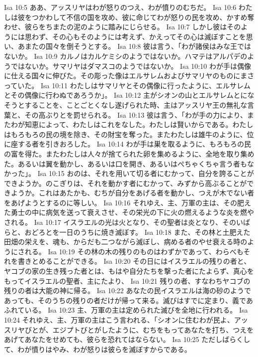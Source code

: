 Isa 10:5  ああ、アッスリヤはわが怒りのつえ、わが憤りのむちだ。
Isa 10:6  わたしは彼をつかわして不信の国を攻め、彼に命じてわが怒りの民を攻め、かすめ奪わせ、彼らをちまたの泥のように踏みにじらせる。
Isa 10:7  しかし彼はそのようには思わず、その心もそのようには考えず、かえってその心は滅ぼすことを思い、あまたの国々を倒そうとする。
Isa 10:8  彼は言う、「わが諸侯はみな王ではないか。
Isa 10:9  カルノはカルケミシのようではないか。ハマテはアルパデのようではないか。サマリヤはダマスコのようではないか。
Isa 10:10  わが手は偶像に仕える国々に伸びた。その彫った像はエルサレムおよびサマリヤのものにまさっていた。
Isa 10:11  わたしはサマリヤとその偶像に行ったように、エルサレムとその偶像に行わぬであろうか」。
Isa 10:12  主がシオンの山とエルサレムとになそうとすることを、ことごとくなし遂げられた時、主はアッスリヤ王の無礼な言葉と、その高ぶりとを罰せられる。
Isa 10:13  彼は言う、「わが手の力により、またわが知恵によって、わたしはこれをなした。わたしは賢いからである。わたしはもろもろの民の境を除き、その財宝を奪った。またわたしは雄牛のように、位に座する者を引きおろした。
Isa 10:14  わが手は巣を取るように、もろもろの民の富を得た。またわたしは人々が捨てられた卵を集めるように、全地を取り集めた。あるいは翼を動かし、あるいは口を開き、あるいはぺちゃくちゃ言う者もなかった」。
Isa 10:15  おのは、それを用いて切る者にむかって、自分を誇ることができようか。のこぎりは、それを動かす者にむかって、みずから高ぶることができようか。これはあたかも、むちが自分をあげる者を動かし、つえが木でない者をあげようとするのに等しい。
Isa 10:16  それゆえ、主、万軍の主は、その肥えた勇士の中に病気を送って衰えさせ、その栄光の下に火の燃えるような炎を燃やされる。
Isa 10:17  イスラエルの光は火となり、その聖者は炎となり、そのいばらと、おどろとを一日のうちに焼き滅ぼす。
Isa 10:18  また、その林と土肥えた田畑の栄えを、魂も、からだも二つながら滅ぼし、病める者のやせ衰える時のようにされる。
Isa 10:19  その林の木の残りのものはわずかであって、わらべもそれを書きとめることができる。
Isa 10:20  その日にはイスラエルの残りの者と、ヤコブの家の生き残った者とは、もはや自分たちを撃った者にたよらず、真心をもってイスラエルの聖者、主にたより、
Isa 10:21  残りの者、すなわちヤコブの残りの者は大能の神に帰る。
Isa 10:22  あなたの民イスラエルは海の砂のようであっても、そのうちの残りの者だけが帰って来る。滅びはすでに定まり、義であふれている。
Isa 10:23  主、万軍の主は定められた滅びを全地に行われる。
Isa 10:24  それゆえ、主、万軍の主はこう言われる、「シオンに住むわが民よ、アッスリヤびとが、エジプトびとがしたように、むちをもってあなたを打ち、つえをあげてあなたをせめても、彼らを恐れてはならない。
Isa 10:25  ただしばらくして、わが憤りはやみ、わが怒りは彼らを滅ぼすからである。
